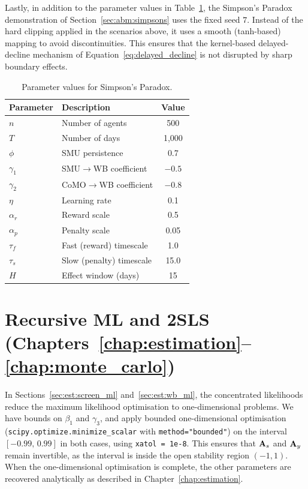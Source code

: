 Lastly, in addition to the parameter values in Table~\ref{tab:abm_simpsons_params}, the Simpson's Paradox demonstration of Section~\ref{sec:abm:simpsons} uses the fixed seed $7$. Instead of the hard clipping applied in the scenarios above, it uses a smooth (tanh-based) mapping to avoid discontinuities. This ensures that the kernel-based delayed-decline mechanism of Equation~\eqref{eq:delayed_decline} is not disrupted by sharp boundary effects.

\begin{table}[htbp]
\centering
\caption[Parameter values for Simpson's Paradox]{Parameter values for Simpson's Paradox.}
\label{tab:abm_simpsons_params}
\begin{tabular}{llc}
\toprule
Parameter & Description & Value \\
\midrule
$n$ & Number of agents & 500 \\
$T$ & Number of days & 1{,}000 \\
$\phi$ & SMU persistence & 0.7 \\
$\gamma_1$ & SMU$\to$WB coefficient & $-0.5$ \\
$\gamma_2$ & CoMO$\to$WB coefficient & $-0.8$ \\
$\eta$ & Learning rate & 0.1 \\
$\alpha_r$ & Reward scale & 0.5 \\
$\alpha_p$ & Penalty scale & 0.05 \\
$\tau_f$ & Fast (reward) timescale & 1.0 \\
$\tau_s$ & Slow (penalty) timescale & 15.0 \\
$H$ & Effect window (days) & 15 \\
\bottomrule
\end{tabular}
\end{table}

\section{Recursive ML and 2SLS (Chapters~\ref{chap:estimation}--\ref{chap:monte_carlo})}
\label{app:code:recursive}
In Sections~\ref{sec:est:screen_ml} and~\ref{sec:est:wb_ml}, the concentrated likelihoods reduce the maximum likelihood optimisation to one-dimensional problems. We have bounds on $\beta_1$ and $\gamma_3$, and apply bounded one-dimensional optimisation (\texttt{scipy.optimize.minimize\_scalar} with \texttt{method="bounded"}) on the interval $[-0.99,\, 0.99]$ in both cases, using \texttt{xatol = 1e-8}. This ensures that $\mathbf{A}_s$ and $\mathbf{A}_y$ remain invertible, as the interval is inside the open stability region $(-1, 1)$. When the one-dimensional optimisation is complete, the other parameters are recovered analytically as described in Chapter~\ref{chap:estimation}.

